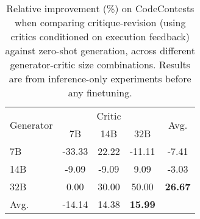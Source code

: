\begin{table}[b!]
\small
\centering
\caption{Relative improvement (\%) on CodeContests when comparing critique-revision (using critics conditioned on execution feedback) against zero-shot generation, across different generator-critic size combinations. Results are from inference-only experiments before any finetuning.}
\label{tab:matrix}
\vspace{3mm}
\begin{tabular}{lcccc}
\toprule
\multirow{2}{*}{Generator} & \multicolumn{3}{c}{Critic} & \multirow{2}{*}{Avg.} \\
 & 7B & 14B & 32B & \\
\midrule
7B & -33.33 & 22.22 & -11.11 & -7.41\\
14B & -9.09 & -9.09 & 9.09 & -3.03\\
32B & 0.00 & 30.00 & 50.00 & \textbf{26.67}\\
\midrule
Avg. & -14.14 & 14.38 & \textbf{15.99} & \\
\bottomrule
\end{tabular}
\end{table}
